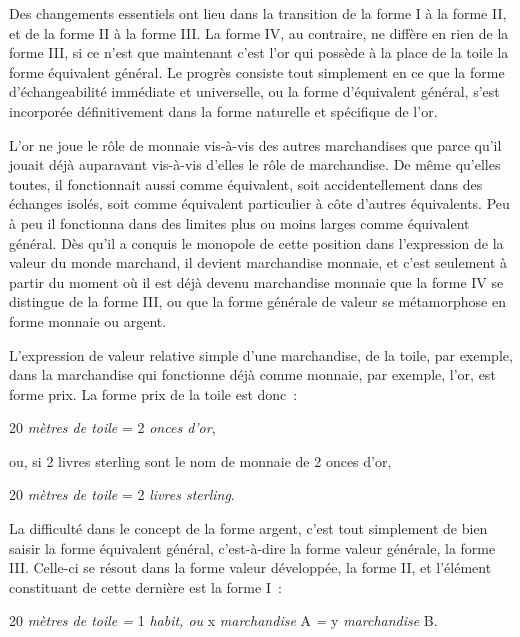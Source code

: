 \documentclass[french,twoside]{book} %
\begin{document}
\noindent Des changements essentiels ont lieu dans la transition de la forme I à la forme II, et de la forme II à la forme III. La forme IV, au contraire, ne diffère en rien de la forme III, si ce n’est que maintenant c’est l’or qui possède à la place de la toile la forme équivalent général. Le progrès consiste tout simplement en ce que la forme d’échangeabilité immédiate et universelle, ou la forme d’équivalent général, s’est incorporée définitivement dans la forme naturelle et spécifique de l’or.\par
L’or ne joue le rôle de monnaie vis-à-vis des autres marchandises que parce qu’il jouait déjà auparavant vis-à-vis d’elles le rôle de marchandise. De même qu’elles toutes, il fonctionnait aussi comme équivalent, soit accidentellement dans des échanges isolés, soit comme équivalent particulier à côte d’autres équivalents. Peu à peu il fonctionna dans des limites plus ou moins larges comme équivalent général. Dès qu’il a conquis le monopole de cette position dans l’expression de la valeur du monde marchand, il devient marchandise monnaie, et c’est seulement à partir du moment où il est déjà devenu marchandise monnaie que la forme IV se distingue de la forme III, ou que la forme générale de valeur se métamorphose en forme monnaie ou argent.\par
L’expression de valeur relative simple d’une marchandise, de la toile, par exemple, dans la marchandise qui fonctionne déjà comme monnaie, par exemple, l’or, est forme prix. La forme prix de la toile est donc :\par
20 \emph{mètres de toile} = 2 \emph{onces d’or},\par
ou, si 2 livres sterling sont le nom de monnaie de 2 onces d’or,\par
20 \emph{mètres de toile} = 2 \emph{livres sterling}.\par
La difficulté dans le concept de la forme argent, c’est tout simplement de bien saisir la forme équivalent général, c’est-à-dire la forme valeur générale, la forme III. Celle-ci se résout dans la forme valeur développée, la forme II, et l’élément constituant de cette dernière est la forme I :\par
20\emph{ mètres de toile =} 1\emph{ habit, ou} x\emph{ marchandise} A\emph{ =} y\emph{ marchandise} B.\par
\end{document}
